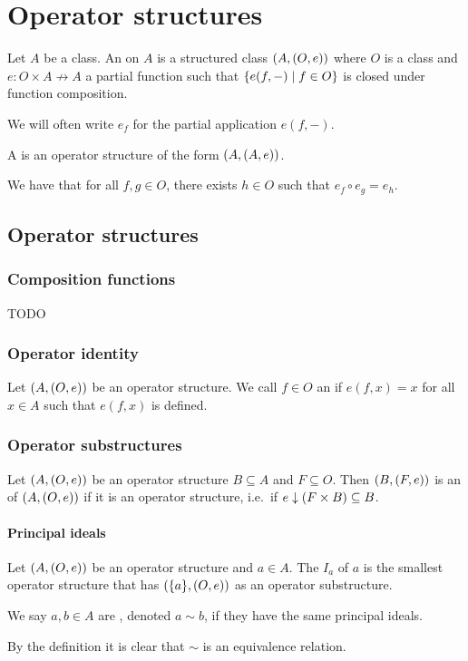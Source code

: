\chapter{Operator structures}
\begin{definition}
Let $A$ be a class. An  on $A$ is a structured class $\left( A, (O, e) \right)$ where $O$ is a class and $e: O\times A \not\to A$ a partial function such that $\left\{ e(f,-) \;\middle|\; f\in O \right\}$ is closed under function composition.

We will often write $e_f$ for the partial application $e(f, -)$.

A  is an operator structure of the form $\left( A, (A, e) \right)$.
\end{definition}
We have that for all $f,g\in O$, there exists $h\in O$ such that $e_f\circ e_g = e_h$.

\section{Operator structures}
\subsection{Composition functions}
TODO

\subsection{Operator identity}
\begin{definition}
Let $\left( A, (O, e) \right)$ be an operator structure. We call $f\in O$ an  if $e(f,x) =x$ for all $x\in A$ such that $e(f,x)$ is defined.
\end{definition}

\subsection{Operator substructures}
\begin{definition}
Let $\left( A, (O, e) \right)$ be an operator structure $B\subseteq A$ and $F\subseteq O$. Then $\left( B, (F, e) \right)$ is an  of $\left( A, (O, e) \right)$ if it is an operator structure, i.e.\ if $e\downarrow(F\times B) \subseteq B$.
\end{definition}

\subsubsection{Principal ideals}
\begin{definition}
Let $\left( A, (O, e) \right)$ be an operator structure and $a\in A$. The  $I_a$ of $a$ is the smallest operator structure that has $\left( \{a\}, (O,e) \right)$ as an operator substructure.

We say $a,b\in A$ are , denoted $a\sim b$, if they have the same principal ideals.
\end{definition}
By the definition it is clear that $\sim$ is an equivalence relation.

